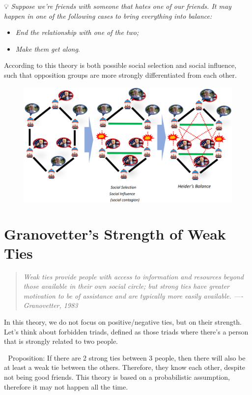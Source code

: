 \documentclass[
  notitlepage,
  onecolumn,
  openany]{book}
\providecommand{\tightlist}{%
  \setlength{\itemsep}{0pt}\setlength{\parskip}{0pt}}
\begin{document}
💡 \emph{Suppose we're friends with someone that hates one of our friends. It
may happen in one of the following cases to bring everything into
balance:}

\begin{itemize}
\tightlist
\item
  \emph{End the relationship with one of the two;}
\item
  \emph{Make them get along}.
\end{itemize}

According to this theory is both possible social selection and social
influence, such that opposition groups are more strongly differentiated
from each other.

\begin{figure}[h!]

{\centering \includegraphics[width=0.6\linewidth]{images/07-Triads and structural holes/Untitled} 

}

\end{figure}

\hypertarget{granovetters-strength-of-weak-ties}{%
\section{Granovetter's Strength of Weak Ties}\label{granovetters-strength-of-weak-ties}}

\begin{quote}
\emph{Weak ties provide people with access to information and resources
beyond those available in their own social circle; but strong ties
have greater motivation to be of assistance and are typically more
easily available. ---- Granovetter, 1983}
\end{quote}

In this theory, we do not focus on positive/negative ties, but on their
strength. Let's think about forbidden triads, defined as those triads
where there's a person that is strongly related to two people.

💁️ Proposition: If there are 2 strong ties between 3 people, then there
will also be at least a weak tie between the others. Therefore, they
know each other, despite not being good friends. This theory is based on
a probabilistic assumption, therefore it may not happen all the time.
\end{document}

